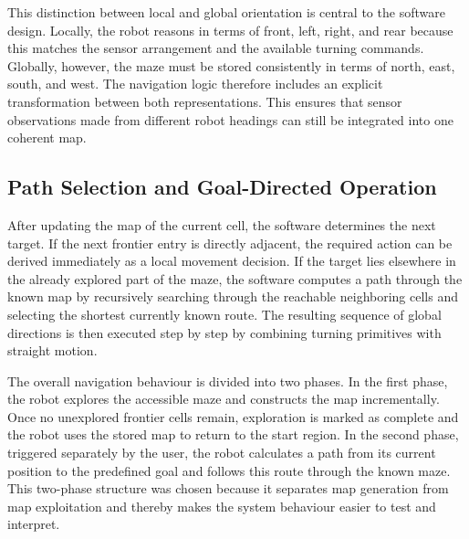 This distinction between local and global orientation is central to the software design. Locally, the robot reasons in terms of front, left, right, and rear because this matches the sensor arrangement and the available turning commands. Globally, however, the maze must be stored consistently in terms of north, east, south, and west. The navigation logic therefore includes an explicit transformation between both representations. This ensures that sensor observations made from different robot headings can still be integrated into one coherent map.

\subsection{Path Selection and Goal-Directed Operation}

After updating the map of the current cell, the software determines the next target. If the next frontier entry is directly adjacent, the required action can be derived immediately as a local movement decision. If the target lies elsewhere in the already explored part of the maze, the software computes a path through the known map by recursively searching through the reachable neighboring cells and selecting the shortest currently known route. The resulting sequence of global directions is then executed step by step by combining turning primitives with straight motion.

The overall navigation behaviour is divided into two phases. In the first phase, the robot explores the accessible maze and constructs the map incrementally. Once no unexplored frontier cells remain, exploration is marked as complete and the robot uses the stored map to return to the start region. In the second phase, triggered separately by the user, the robot calculates a path from its current position to the predefined goal and follows this route through the known maze. This two-phase structure was chosen because it separates map generation from map exploitation and thereby makes the system behaviour easier to test and interpret.
